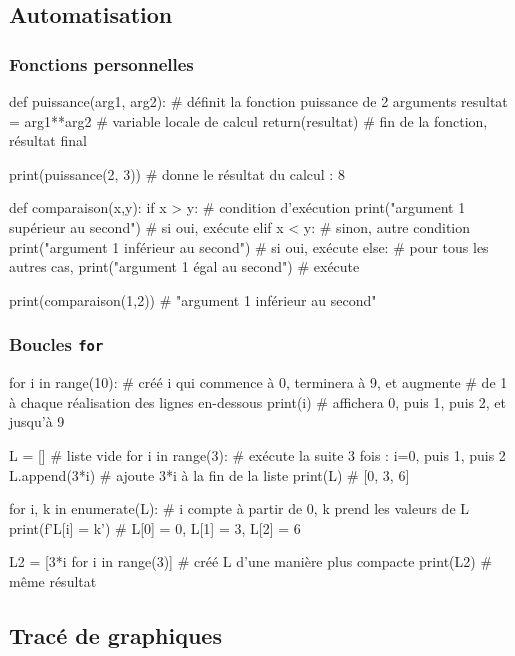 \documentclass[a4paper, 12pt, garamond]{book}
\begin{document}
\subsection{Automatisation}
\subsubsection{Fonctions personnelles}
\begin{python}
def puissance(arg1, arg2): # définit la fonction puissance de 2 arguments
resultat = arg1**arg2  # variable locale de calcul
return(resultat)       # fin de la fonction, résultat final

print(puissance(2, 3))     # donne le résultat du calcul : 8

def comparaison(x,y):
if x > y:                                    # condition d'exécution
print("argument 1 supérieur au second")  # si oui, exécute
elif x < y:                                  # sinon, autre condition
print("argument 1 inférieur au second")  # si oui, exécute
else:                                        # pour tous les autres cas,
print("argument 1 égal au second")       # exécute

print(comparaison(1,2))    # "argument 1 inférieur au second"
\end{python}

\subsubsection{Boucles \texttt{for}}
\begin{python}
for i in range(10):   # créé i qui commence à 0, terminera à 9, et augmente
# de 1 à chaque réalisation des lignes en-dessous
print(i)          # affichera 0, puis 1, puis 2, et jusqu'à 9

L = []                # liste vide
for i in range(3):    # exécute la suite 3 fois : i=0, puis 1, puis 2
L.append(3*i)     # ajoute 3*i à la fin de la liste
print(L)              # [0, 3, 6]

for i, k in enumerate(L):  # i compte à partir de 0, k prend les valeurs de L
print(f'L[{i}] = {k}') # L[0] = 0, L[1] = 3, L[2] = 6

L2 = [3*i for i in range(3)] # créé L d'une manière plus compacte
print(L2)                    # même résultat
\end{python}

\subsection{Tracé de graphiques}
\end{document}
